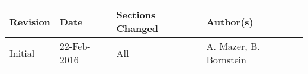 %
%

\section*{}

\renewcommand{\arraystretch}{1.5}
\begin{table}[htp]
    \begin{center}
        \begin{tabular}{|p{2cm}|p{2.5cm}|p{6cm}|p{4cm}|}
            \hline
            \textbf{Revision} & \textbf{Date} & \textbf{Sections Changed} & \textbf{Author(s)} \\
            \hline\hline
            Initial & 22-Feb-2016 & All & A. Mazer, B. Bornstein \\
            \hline
        \end{tabular}
    \end{center}
\end{table}
